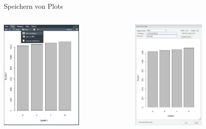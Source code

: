 \documentclass[aspectratio = 169]{chariteBeamer}
\begin{document}
\begin{frame}[fragile]{Speichern von Plots}
	\begin{columns}[T]
		\begin{column}{0.5\textwidth}
			\begin{center}
				\includegraphics[height=5.5cm]{SaveImage}
			\end{center}
		\end{column}
		\begin{column}{0.5\textwidth}
			\begin{center}
				\includegraphics[height=5.5cm]{SaveImage2}
			\end{center}
		\end{column}
	\end{columns}	
\end{frame}
\end{document}
